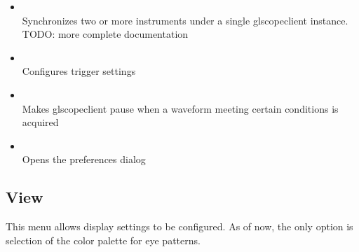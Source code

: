 \begin{itemize}

\item {}\\
Synchronizes two or more instruments under a single glscopeclient instance. TODO: more complete documentation

\item {}\\
Configures trigger settings

\item {}\\
Makes glscopeclient pause when a waveform meeting certain conditions is acquired

\item {}\\
Opens the preferences dialog

\end{itemize}

\subsection{View}

This menu allows display settings to be configured. As of now, the only option is selection of the color palette for
eye patterns.

